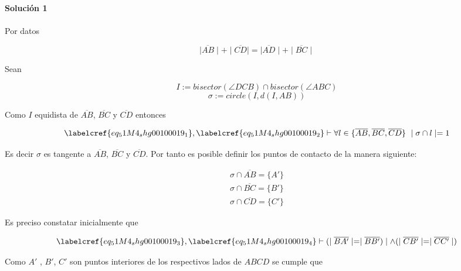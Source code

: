 
\noindent\textbf{Solución 1}\\\\

Por datos 

\begin{equation} \label{eq_51M4_shg00100019_0}
	\mid\overline{AB}\mid + \mid\overline{CD}\mid = \mid\overline{AD}\mid + \mid\overline{BC}\mid
\end{equation}

Sean

\begin{equation} \label{eq_51M4_shg00100019_1}
	I := bisector(\angle DCB) \cap bisector(\angle ABC)
\end{equation}
\begin{equation} \label{eq_51M4_shg00100019_2}
	\sigma := circle(I, d(I, AB))
\end{equation}

Como $I$ equidista de $\overline{AB}$, $\overline{BC}$ y $\overline{CD}$ entonces 

\begin{equation} \label{eq_51M4_shg00100019_3}
	\labelcref{eq_51M4_shg00100019_1}, \labelcref{eq_51M4_shg00100019_2} \vdash \forall l \in \{\overline{AB}, \overline{BC}, \overline{CD} \}\ \mid \sigma \cap l \mid = 1
\end{equation}

Es decir $\sigma$ es tangente a $\overline{AB}$, $\overline{BC}$ y $\overline{CD}$. Por tanto es posible definir los puntos de contacto de la manera siguiente:

\begin{equation} \label{eq_51M4_shg00100019_4}
\begin{gathered}
	\sigma \cap \overline{AB} = \{A'\} \\
	\sigma \cap \overline{BC} = \{B'\} \\
	\sigma \cap \overline{CD} = \{C'\}
\end{gathered}
\end{equation}

Es preciso constatar inicialmente que 

\begin{equation} \label{eq_51M4_shg00100019_5}
	\labelcref{eq_51M4_shg00100019_3}, \labelcref{eq_51M4_shg00100019_4} \vdash (\mid\overline{BA'}\mid = \mid\overline{BB'})\mid \land (\mid\overline{CB'}\mid = \mid\overline{CC'}\mid)
\end{equation}

Como $A'$ , $B'$, $C'$ son puntos interiores de los respectivos lados de $ABCD$ se cumple que

